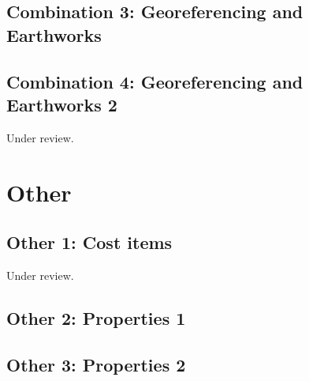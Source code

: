 \documentclass{scrartcl}
\begin{document}
\subsection{Combination 3: Georeferencing and Earthworks}
\label{sec:georef_earth_1}
\clearpage

\subsection{Combination 4: Georeferencing and Earthworks 2} %
\label{sec:georef_earth_2}
Under review.%
\clearpage

\section{Other}
\label{sec:other}

\subsection{Other 1: Cost items} %
\label{sec:other_1}
Under review.%
\clearpage

\subsection{Other 2: Properties 1} %
\label{sec:other_2}
\clearpage

\subsection{Other 3: Properties 2} %
\label{sec:other_3}
\clearpage
\end{document}
